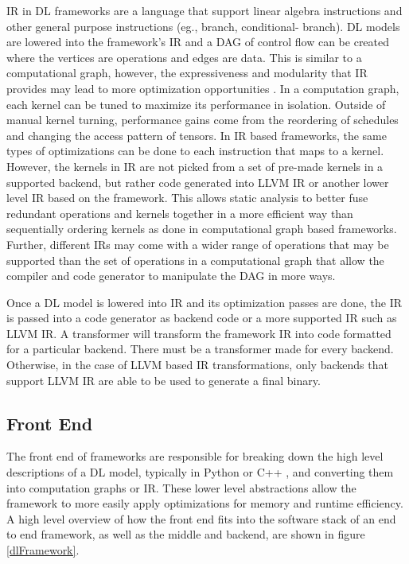 IR in DL frameworks are a language that support linear algebra instructions and
other general purpose instructions (eg., branch, conditional- branch). DL
models are lowered into the framework's IR and a DAG of control flow
\cite{nGraph} can be created where the vertices are operations and edges are
data. This is similar to a computational graph, however, the expressiveness and
modularity that IR provides may lead to more optimization opportunities
\cite{DLVM}. In a computation graph, each kernel can be tuned to maximize its
performance in isolation. Outside of manual kernel turning, performance gains
come from the reordering of schedules and changing the access pattern of
tensors.  In IR based frameworks, the same types of optimizations can be done
to each instruction that maps to a kernel. However, the kernels in IR are not
picked from a set of pre-made kernels in a supported backend, but rather code
generated into LLVM IR or another lower level IR based on the framework. This
allows static analysis to better fuse redundant operations and kernels together
in a more efficient way than sequentially ordering kernels as done in
computational graph based frameworks. Further, different IRs may come with
a wider range of operations that may be supported than the set of operations in
a computational graph that allow the compiler and code generator to manipulate
the DAG in more ways.

Once a DL model is lowered into IR and its optimization passes are done, the IR
is passed into a code generator as backend code or a more supported IR such as
LLVM IR. A transformer will transform the framework IR into code formatted for
a particular backend. There must be a transformer made for every backend. Otherwise,
in the case of LLVM based IR transformations, only backends that support LLVM
IR are able to be used to generate a final binary.


\subsection{Front End}
The front end of frameworks are responsible for breaking down the high level
descriptions of a DL model, typically in Python or C++ \cite{tensorflow}, and
converting them into computation graphs or IR. These lower level abstractions
allow the framework to more easily apply optimizations for memory and runtime
efficiency. A high level overview of how the front end fits into the software
stack of an end to end framework, as well as the middle and backend, are shown
in figure \ref{dlFramework}.

